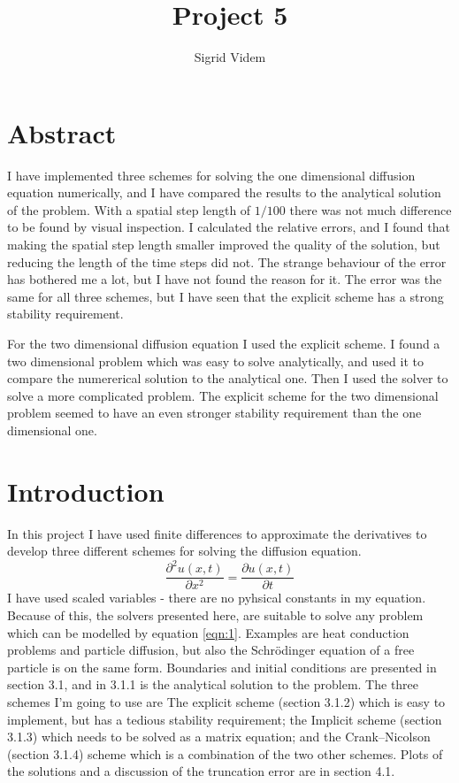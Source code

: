 \documentclass{article}
\author{Sigrid Videm}
\title{Project 5}
\begin{document}
\maketitle

\section{Abstract} 
I have implemented three schemes for solving the one dimensional diffusion equation numerically, and I have compared the results to the analytical solution of the problem. With a spatial step length of $1/100$ there was not much difference to be found by visual inspection. I calculated the relative errors, and I found that making the spatial step length smaller improved the quality of the solution, but reducing the length of the time steps did not. The strange behaviour of the error has bothered me a lot, but I have not found the reason for it. The error was the same for all three schemes, but I have seen that the explicit scheme has a strong stability requirement. 

For the two dimensional diffusion equation I used the explicit scheme. I found a two dimensional problem which was easy to solve analytically, and used it to compare the numererical solution to the analytical one. Then I used the solver to solve a more complicated problem. The explicit scheme for the two dimensional problem seemed to have an even stronger stability requirement than the one dimensional one. 
\tableofcontents %


\section{Introduction}
In this project I have used finite differences to approximate the derivatives to develop three different schemes for solving the diffusion equation.
\begin{equation}\label{eqn:1}
 \frac{\partial^2 u(x,t)}{\partial x^2} =\frac{\partial u(x,t)}{\partial t}
\end{equation}
 I have used scaled variables - there are no pyhsical constants in my equation. Because of this, the solvers presented here, are suitable to solve any problem which can be modelled by equation \ref{eqn:1}. Examples are heat conduction problems and particle diffusion, but also the Schrödinger equation of a free particle is on the same form. Boundaries and initial conditions are presented in section 3.1, and in 3.1.1 is the analytical solution to the problem. The three schemes I'm going to use are The explicit scheme (section 3.1.2) which is easy to implement, but has a tedious stability requirement; the Implicit scheme (section 3.1.3) which needs to be solved as a matrix equation; and the Crank--Nicolson (section 3.1.4) scheme which is a combination of the two other schemes. Plots of the solutions and a discussion of the truncation error are in section 4.1.
 
\end{document}

